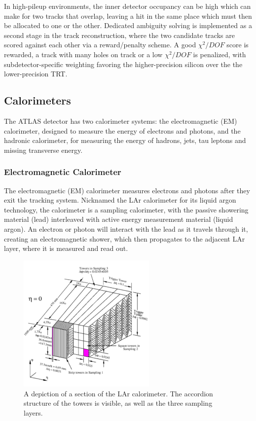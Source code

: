 In high-pileup environments, the inner detector occupancy can be high which can make for two tracks that overlap, leaving a hit in the same place which must then be allocated to one or the other.  Dedicated ambiguity solving is implemented as a second stage in the track reconstruction, where the two candidate tracks are scored against each other via a reward/penalty scheme.  A good $\chi^2/DOF$ score is rewarded, a track with many holes on track or a low $\chi^2/DOF$ is penalized, with subdetector-specific weighting favoring the higher-precision silicon over the the lower-precision TRT. 


\subsection{Calorimeters}
The ATLAS detector has two calorimeter systems: the electromagnetic (EM) calorimeter, designed to measure the energy of electrons and photons, and the hadronic calorimeter, for measuring the energy of hadrons, jets, tau leptons and missing transverse energy.  

\subsubsection{Electromagnetic Calorimeter}
\label{sec:em_cal}

The electromagnetic (EM) calorimeter measures electrons and photons after they exit the tracking system.  Nicknamed the LAr calorimeter for its liquid argon technology,  the calorimeter is a sampling calorimeter, with the passive showering material (lead) interleaved with active energy measurement material (liquid argon).  An electron or photon will interact with the lead as it travels through it, creating an electromagnetic shower, which then propagates to the adjacent LAr layer, where it is measured and read out.


\begin{figure}
\begin{center}
	\includegraphics[width=0.6\textwidth]{ATLASDetector/images/LArg_accordion.pdf}	
	\caption{A depiction of a section of the LAr calorimeter.  The accordion structure of the towers is visible, as well as the three sampling layers. 	\label{fig:lar}}
\end{center}
\end{figure}


